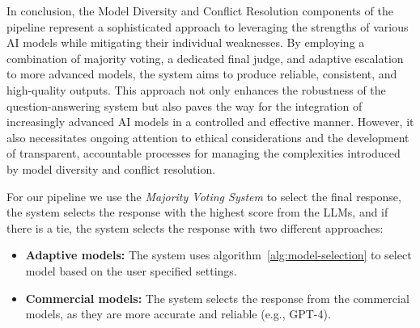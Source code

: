 In conclusion, the Model Diversity and Conflict Resolution components of the pipeline represent a sophisticated approach to leveraging the strengths of various AI models while mitigating their individual weaknesses. By employing a combination of majority voting, a dedicated final judge, and adaptive escalation to more advanced models, the system aims to produce reliable, consistent, and high-quality outputs. This approach not only enhances the robustness of the question-answering system but also paves the way for the integration of increasingly advanced AI models in a controlled and effective manner. However, it also necessitates ongoing attention to ethical considerations and the development of transparent, accountable processes for managing the complexities introduced by model diversity and conflict resolution.


For our pipeline we use the \textit{Majority Voting System} to select the final response, the system selects the response with the highest score from the LLMs, and if there is a tie, the system selects the response with two different approaches:
\begin{itemize}
    \item \textbf{Adaptive models:} The system uses algorithm~\ref{alg:model-selection} to select model based on the user specified settings.
    \item \textbf{Commercial models:} The system selects the response from the commercial models, as they are more accurate and reliable (e.g., GPT-4).
\end{itemize}

